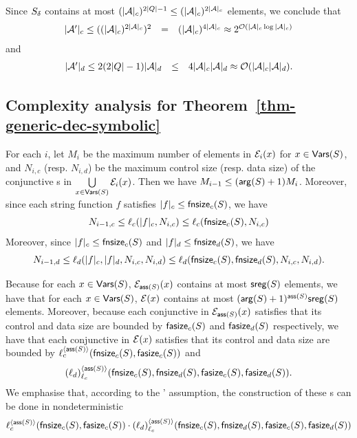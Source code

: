 Since $S_{\delta}$ contains at most $(|\mathcal{A}|_c)^{2 |Q|-1} \le (|\mathcal{A}|_c)^{2 |\mathcal{A}|_c}$ elements, we conclude that 
$$
\begin{array}{l c l}
|\mathcal{A}'|_c \le ((|\mathcal{A}|_c)^{2|\mathcal{A}|_c})^2  & = & (|\mathcal{A}|_c)^{4|\mathcal{A}|_c} 
 \approx    2^{\mathcal{O}\left(|\mathcal{A}|_c \log |\mathcal{A}|_c\right)}
\end{array}
$$ 
and 
$$
\begin{array}{l c l}
|\mathcal{A}'|_d \le 2(2|Q|-1) |\mathcal{A}|_d & \le & 4 |\mathcal{A}|_c |\mathcal{A}|_d 
\approx   \mathcal{O}( |\mathcal{A}|_c |\mathcal{A}|_d).
\end{array}
$$





\subsection{Complexity analysis for Theorem~\ref{thm-generic-dec-symbolic}}

For each $i$, 
let $M_i$ be the maximum number of elements in $\mathcal{E}_i(x)$ for $x  \in \mathsf{Vars}(S)$,
and $N_{i,c}$ (resp. $N_{i, d}$) be the maximum control size (resp. data size) of the conjunctive \SA{}s in $\bigcup \limits_{x \in \mathsf{Vars}(S)} \mathcal{E}_i(x)$.
Then we have $M_{i-1} \le (\mathsf{arg}(S)+1)M_i $. Moreover, since each string function $f$ satisfies  $|f|_c \le \mathsf{fnsize}_c(S)$, we have 
%
$$N_{i-1, c} \le \ell_c(|f|_c, N_{i, c}) \le \ell_c(\mathsf{fnsize}_c(S), N_{i,c})$$ 
%
Moreover, since $|f|_c \le \mathsf{fnsize}_c(S)$ and $|f|_d \le \mathsf{fnsize}_d(S)$, we have
%
$$N_{i-1, d} \le \ell_d(|f|_c, |f|_d, N_{i, c}, N_{i,d}) \le \ell_d(\mathsf{fnsize}_c(S), \mathsf{fnsize}_d(S), N_{i, c}, N_{i,d}).$$ 

Because for each $x \in \mathsf{Vars}(S)$, $\mathcal{E}_{\mathsf{ass}(S)}(x)$ contains at most $\mathsf{sreg}(S)$ elements, we have that for each $x \in \mathsf{Vars}(S)$, $\mathcal{E}(x)$ contains at most $(\mathsf{arg}(S)+1)^{\mathsf{ass}(S)}\mathsf{sreg}(S)$ elements. 
Moreover, because each conjunctive \SA{} in $\mathcal{E}_{\mathsf{ass}(S)}(x)$ satisfies that its control and data size are bounded by $\mathsf{fasize}_c(S)$ and $\mathsf{fasize}_d(S)$ respectively, 
we have that each conjunctive \SA{} in $\mathcal{E}(x)$ satisfies that its control and data size are bounded by $\ell_c^{\langle \mathsf{ass}(S) \rangle}(\mathsf{fnsize}_c(S), \mathsf{fasize}_c(S))$ and 
%
\[ (\ell_d)^{\langle  \mathsf{ass}(S) \rangle}_{\ell_c}(\mathsf{fnsize}_c(S), \mathsf{fnsize}_d(S), \mathsf{fasize}_c(S), \mathsf{fasize}_d(S)).\]
% 
We emphasise that, according to the \prerec{}' assumption, the construction of these \SA{}s can be done in nondeterministic 
%
{
\small
$$\ell_c^{\langle  \mathsf{ass}(S) \rangle}(\mathsf{fnsize}_c(S), \mathsf{fasize}_c(S)) \cdot (\ell_d)^{\langle \mathsf{ass}(S) \rangle}_{\ell_c}(\mathsf{fnsize}_c(S),  \mathsf{fnsize}_d(S), \mathsf{fasize}_c(S), \mathsf{fasize}_d(S))$$
}

